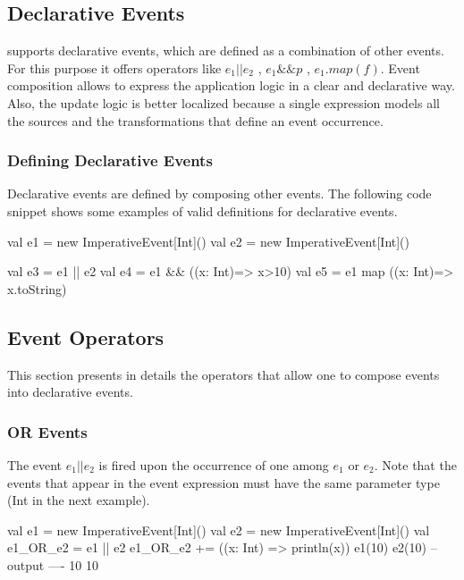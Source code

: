 \documentclass[10pt,a4paper]{article}
\newcommand{\code}[1]{{\fontfamily{cmtt}\small\selectfont#1}}
\newcommand{\REScala}{{\small \sc{REScala}}\xspace}
\begin{document}
\subsection{Declarative Events}

\REScala supports declarative events, which are defined as a
combination of other events. For this purpose it offers operators like
$e_1||e_2$ , $e_1\&\&p$ , $e_1.map(f)$. Event composition allows to
express the application logic in a clear and declarative way. Also,
the update logic is better localized because a single expression
models all the sources and the transformations that define an event
occurrence.


\subsubsection{Defining Declarative Events}

Declarative events are defined by composing other events. The
following code snippet shows some examples of valid definitions for
declarative events.

\begin{codenv}
val e1 = new ImperativeEvent[Int]()
val e2 = new ImperativeEvent[Int]()

val e3 = e1 || e2
val e4 = e1 && ((x: Int)=> x>10)
val e5 = e1 map ((x: Int)=> x.toString)
\end{codenv}


\subsection{Event Operators}

This section presents in details the operators that allow one to
compose events into declarative events.

\subsubsection{OR Events}

The event $e_1 || e_2$ is fired upon the occurrence of one among $e_1$
or $e_2$. Note that the events that appear in the event expression
must have the same parameter type (\code{Int} in the next example).

\begin{codenv}
val e1 = new ImperativeEvent[Int]()
val e2 = new ImperativeEvent[Int]()
val e1_OR_e2 = e1 || e2
e1_OR_e2 += ((x: Int) => println(x))
e1(10)
e2(10)
-- output ----
10
10
\end{codenv}
\end{document}
